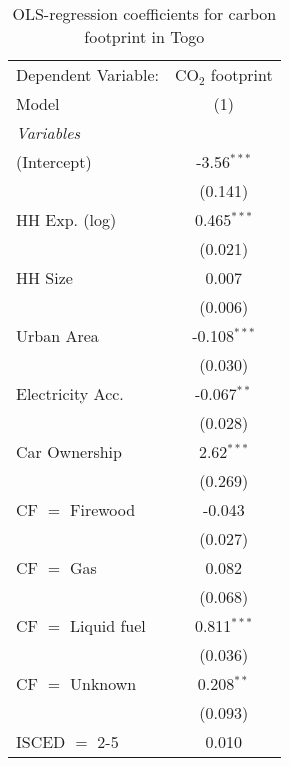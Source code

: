 
\begin{table}[htbp!]
   \centering
   \small
   \begin{adjustbox}{width = 1\textwidth, max height = 0.95\textheight, center}
      \begin{threeparttable}[b]
         \caption{\label{tab:OLS_2_TGO} OLS-regression coefficients for carbon footprint in Togo}
         \begin{tabular}{lc}
            \tabularnewline \midrule \midrule
            Dependent Variable: & CO$_{2}$ footprint\\  
            Model               & (1)\\  
            \midrule
            \emph{Variables}\\
            (Intercept)         & -3.56$^{***}$\\   
                                & (0.141)\\   
            HH Exp. (log)       & 0.465$^{***}$\\   
                                & (0.021)\\   
            HH Size             & 0.007\\   
                                & (0.006)\\   
            Urban Area          & -0.108$^{***}$\\   
                                & (0.030)\\   
            Electricity Acc.    & -0.067$^{**}$\\   
                                & (0.028)\\   
            Car Ownership       & 2.62$^{***}$\\   
                                & (0.269)\\   
            CF $=$ Firewood     & -0.043\\   
                                & (0.027)\\   
            CF $=$ Gas          & 0.082\\   
                                & (0.068)\\   
            CF $=$ Liquid fuel  & 0.811$^{***}$\\   
                                & (0.036)\\   
            CF $=$ Unknown      & 0.208$^{**}$\\   
                                & (0.093)\\   
            ISCED $=$ 2-5       & 0.010\\   

\end{tabular}
\end{threeparttable}
\end{adjustbox}
\end{table}
